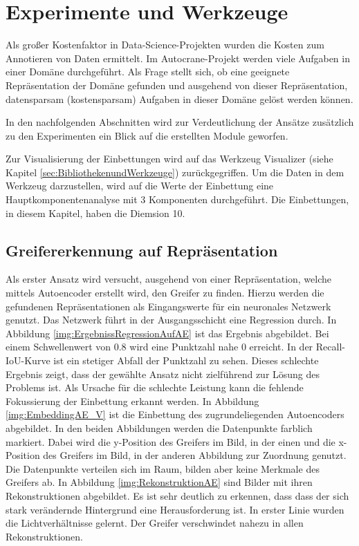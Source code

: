 \chapter{Experimente und Werkzeuge}
\label{chap:HauptteilMultiTaskLernen}
Als großer Kostenfaktor in Data-Science-Projekten wurden die Kosten zum Annotieren von Daten ermittelt. Im Autocrane-Projekt werden viele Aufgaben in einer Domäne durchgeführt. Als Frage stellt sich, ob eine geeignete Repräsentation der Domäne gefunden und ausgehend von dieser Repräsentation, datensparsam (kostensparsam) Aufgaben in dieser Domäne gelöst werden können.  

In den nachfolgenden Abschnitten wird zur Verdeutlichung der Ansätze zusätzlich zu den Experimenten ein Blick auf die erstellten Module geworfen.

Zur Visualisierung der Einbettungen wird auf das Werkzeug Visualizer (siehe Kapitel \ref{sec:BibliothekenundWerkzeuge}) zurückgegriffen. Um die Daten in dem Werkzeug darzustellen, wird auf die Werte der Einbettung eine Hauptkomponentenanalyse mit 3 Komponenten durchgeführt. Die Einbettungen, in diesem Kapitel, haben die Diemsion 10.  

	\section{Greifererkennung auf Repräsentation}
	\label{sec:GreifererkennungAufAutoencoder}
	Als erster Ansatz wird versucht, ausgehend von einer Repräsentation, welche mittels Autoencoder erstellt wird, den Greifer zu finden. Hierzu werden die gefundenen Repräsentationen als Eingangswerte für ein neuronales Netzwerk genutzt. Das Netzwerk führt in der Ausgangsschicht eine Regression durch. In Abbildung \ref{img:ErgebnissRegressionAufAE} ist das Ergebnis abgebildet. Bei einem Schwellenwert von 0.8 wird eine Punktzahl nahe 0 erreicht. In der Recall-IoU-Kurve ist ein stetiger Abfall der Punktzahl zu sehen. Dieses schlechte Ergebnis zeigt, dass der gewählte Ansatz nicht zielführend zur Lösung des Problems ist. Als Ursache für die schlechte Leistung kann die fehlende Fokussierung der Einbettung erkannt werden. In Abbildung \ref{img:EmbeddingAE_V} ist die Einbettung des zugrundeliegenden Autoencoders abgebildet. In den beiden Abbildungen werden die Datenpunkte farblich markiert. Dabei wird die y-Position des Greifers im Bild, in der einen und die x-Position des Greifers im Bild, in der anderen Abbildung zur Zuordnung genutzt. Die Datenpunkte verteilen sich im Raum, bilden aber keine Merkmale des Greifers ab. In Abbildung \ref{img:RekonstruktionAE} sind Bilder mit ihren Rekonstruktionen abgebildet. Es ist sehr deutlich zu erkennen, dass dass der sich stark verändernde Hintergrund eine Herausforderung ist. In erster Linie wurden die Lichtverhältnisse gelernt. Der Greifer verschwindet nahezu in allen Rekonstruktionen.   
    
